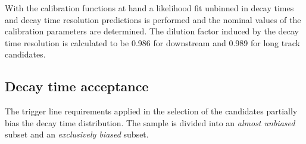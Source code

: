 With the calibration functions at hand a likelihood fit unbinned in decay
times and decay time resolution predictions is performed and the nominal
values of the calibration parameters are determined. The dilution factor
induced by the decay time resolution is calculated to be \num{0.986} for
downstream and \num{0.989} for long track candidates.

\subsection{Decay time acceptance}
\label{sec:bd2jpsiks:decaytime:acceptance}

The trigger line requirements applied in the selection of the \BdToJPsiKS
candidates partially bias the decay time distribution. The sample is divided
into an \emph{almost unbiased} subset and an \emph{exclusively biased} subset.